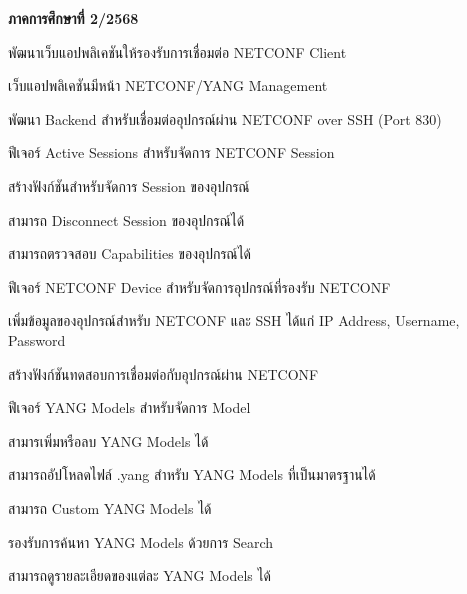 \hspace*{1 cm}\textbf{ภาคการศึกษาที่ 2/2568}
\begin{mycustomenum2}
    \item พัฒนาเว็บแอปพลิเคชันให้รองรับการเชื่อมต่อ NETCONF Client
    \begin{mycustomenum2}
        \item เว็บแอปพลิเคชันมีหน้า NETCONF/YANG Management
        \item พัฒนา Backend สำหรับเชื่อมต่ออุปกรณ์ผ่าน NETCONF over SSH (Port 830)
    \end{mycustomenum2}

    \item ฟีเจอร์ Active Sessions สำหรับจัดการ NETCONF Session
    \begin{mycustomenum2}
        \item สร้างฟังก์ชันสำหรับจัดการ Session ของอุปกรณ์
            \begin{mycustomenum2}
                \item สามารถ Disconnect Session ของอุปกรณ์ได้
            \end{mycustomenum2} 
        \item สามารถตรวจสอบ Capabilities ของอุปกรณ์ได้ 
    \end{mycustomenum2}

    \item ฟีเจอร์ NETCONF Device สำหรับจัดการอุปกรณ์ที่รองรับ NETCONF
    \begin{mycustomenum2}
        \item เพิ่มข้อมูลของอุปกรณ์สำหรับ NETCONF และ SSH ได้แก่ IP Address, Username, Password
        \item สร้างฟังก์ชันทดสอบการเชื่อมต่อกับอุปกรณ์ผ่าน NETCONF
    \end{mycustomenum2}
    \vspace{1 cm}
    \item ฟีเจอร์ YANG Models สำหรับจัดการ Model
    \begin{mycustomenum2}
        \item สามารเพิ่มหรือลบ YANG Models ได้
        \item สามารถอัปโหลดไฟล์ .yang สำหรับ YANG Models ที่เป็นมาตรฐานได้
        \item สามารถ Custom YANG Models ได้
        \item รองรับการค้นหา YANG Models ด้วยการ Search
        \item สามารถดูรายละเอียดของแต่ละ YANG Models ได้
    \end{mycustomenum2}


\end{mycustomenum2}
